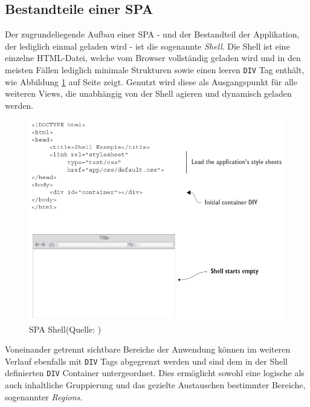 \documentclass[a4paper,12pt,twoside]{scrreprt}
\begin{document}
\subsection{Bestandteile einer \acs{SPA}}
\label{subsec:spa-bestandteile}
Der zugrundeliegende Aufbau einer \acl{SPA} - und der Bestandteil der Applikation, der lediglich einmal geladen wird - ist die sogenannte \textit{Shell}. Die Shell ist eine einzelne HTML-Datei, welche vom Browser vollständig geladen wird und in den meisten Fällen lediglich minimale Strukturen sowie einen leeren \texttt{DIV} Tag enthält, wie Abbildung \ref{fig:spa-shell} auf Seite \pageref{fig:spa-overview} zeigt. Genutzt wird diese als Ausgangspunkt für alle weiteren Views, die unabhängig von der Shell agieren und dynamisch geladen werden. \parencite[][Seite 8]{scott_spa_2015}

\begin{figure}[ht]
    \centering
    \includegraphics[scale=0.5]{images/SPA_shell_Scott.png}
    \caption[\acl{SPA} Shell]{\acl{SPA} Shell\newline(Quelle: \cite[][Seite 8]{scott_spa_2015})}
    \label{fig:spa-shell}
\end{figure}

Voneinander getrennt sichtbare Bereiche der Anwendung können im weiteren Verlauf ebenfalls mit \texttt{DIV} Tags abgegrenzt werden und sind dem in der Shell definierten \texttt{DIV} Container untergeordnet. Dies ermöglicht sowohl eine logische als auch inhaltliche Gruppierung und das gezielte Austauschen bestimmter Bereiche, sogenannter \textit{Regions}. \parencite[][Seite 9]{scott_spa_2015}
\end{document}
